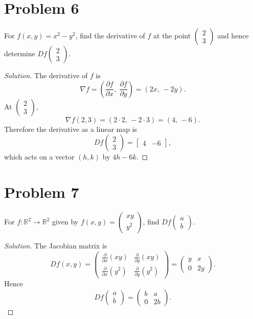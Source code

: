 \documentclass{article}
\begin{document}
\section*{Problem 6}
For \( f(x,y)=x^2-y^2 \), find the derivative of \( f \) at the point \(\begin{pmatrix}2\\3\end{pmatrix}\) and hence determine \( Df\!\begin{pmatrix}2\\3\end{pmatrix} \).

\begin{proof}[Solution]
	The derivative of \( f \) is
	\[
		\nabla f = \left( \frac{\partial f}{\partial x},\; \frac{\partial f}{\partial y} \right) = (2x,\,-2y).
	\]
	At \(\begin{pmatrix}2\\3\end{pmatrix}\),
	\[
		\nabla f(2,3) = (2\cdot2,\,-2\cdot3) = (4,\,-6).
	\]
	Therefore the derivative as a linear map is
	\[
		Df\!\begin{pmatrix}2\\3\end{pmatrix} = \begin{bmatrix} 4 & -6 \end{bmatrix},
	\]
	which acts on a vector \((h,k)\) by \(4h - 6k\).
\end{proof}
\section*{Problem 7}
For \(f:\mathbb{R}^2\to\mathbb{R}^2\) given by \(f(x,y)=\begin{pmatrix} xy \\ y^2 \end{pmatrix}\), find \(Df\!\begin{pmatrix}a\\b\end{pmatrix}\).

\begin{proof}[Solution]
	The Jacobian matrix is
	\[
		Df(x,y)=\begin{pmatrix}
			\frac{\partial}{\partial x}(xy)  & \frac{\partial}{\partial y}(xy)  \\[4pt]
			\frac{\partial}{\partial x}(y^2) & \frac{\partial}{\partial y}(y^2)
		\end{pmatrix}
		=\begin{pmatrix}
			y & x  \\
			0 & 2y
		\end{pmatrix}.
	\]
	Hence
	\[
		Df\!\begin{pmatrix}a\\b\end{pmatrix}=\begin{pmatrix}
			b & a  \\
			0 & 2b
		\end{pmatrix}.
	\]
\end{proof}
\end{document}
